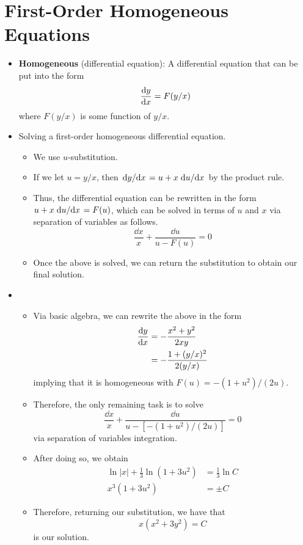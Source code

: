 \documentclass[../main.tex]{subfiles}
\begin{document}
\section{First-Order Homogeneous Equations}
\begin{itemize}
    \item \textbf{Homogeneous} (differential equation): A differential equation that can be put into the form
    \begin{equation*}
        \dv{y}{x} = F(y/x)
    \end{equation*}
    where $F(y/x)$ is some function of $y/x$.
    \item Solving a first-order homogeneous differential equation.
    \begin{itemize}
        \item We use $u$-substitution.
        \item If we let $u=y/x$, then $\dv*{y}{x}=u+x\dv*{u}{x}$ by the product rule.
        \item Thus, the differential equation can be rewritten in the form $u+x\dv*{u}{x}=F(u)$, which can be solved in terms of $u$ and $x$ via separation of variables as follows.
        \begin{equation*}
            \frac{\dd{x}}{x}+\frac{\dd{u}}{u-F(u)} = 0
        \end{equation*}
        \item Once the above is solved, we can return the substitution to obtain our final solution.
    \end{itemize}
    \item {}
    \begin{itemize}
        \item Via basic algebra, we can rewrite the above in the form
        \begin{align*}
            \dv{y}{x} &= -\frac{x^2+y^2}{2xy}\\
            &= -\frac{1+(y/x)^2}{2(y/x)}
        \end{align*}
        implying that it is homogeneous with $F(u)=-(1+u^2)/(2u)$.
        \item Therefore, the only remaining task is to solve
        \begin{equation*}
            \frac{\dd{x}}{x}+\frac{\dd{u}}{u-[-(1+u^2)/(2u)]} = 0
        \end{equation*}
        via separation of variables integration.
        \item After doing so, we obtain
        \begin{align*}
            \ln|x|+\frac{1}{3}\ln(1+3u^2) &= \frac{1}{3}\ln C\\
            x^3(1+3u^2) &= \pm C
        \end{align*}
        \item Therefore, returning our substitution, we have that
        \begin{equation*}
            x(x^2+3y^2) = C
        \end{equation*}
        is our solution.
    \end{itemize}
\end{itemize}
\end{document}
